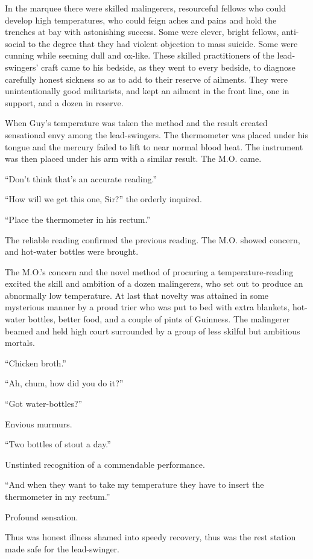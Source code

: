 In the marquee there were skilled malingerers, resourceful fellows who could develop high temperatures, who could feign aches and pains and hold the trenches at bay with astonishing success. Some were clever, bright fellows, anti-social to the degree that they had violent objection to mass suicide. Some were cunning while seeming dull and ox-like. These skilled practitioners of the lead-swingers' craft came to his bedside, as they went to every bedside, to diagnose carefully honest sickness so as to add to their reserve of ailments. They were unintentionally good militarists, and kept an ailment in the front line, one in support, and a dozen in reserve.

When Guy's temperature was taken the method and the result created sensational envy among the lead-swingers. The thermometer was placed under his tongue and the mercury failed to lift to near normal blood heat. The instrument was then placed under his arm with a similar result. The M.O. came.

``Don't think that's an accurate reading.''

``How will we get this one, Sir?'' the orderly inquired.

``Place the thermometer in his rectum.''

The reliable reading confirmed the previous reading. The M.O. showed concern, and hot-water bottles were brought.

The M.O.'s concern and the novel method of procuring a temperature-reading excited the skill and ambition of a dozen malingerers, who set out to produce an abnormally low temperature. At last that novelty was attained in some mysterious manner by a proud trier who was put to bed with extra blankets, hot-water bottles, better food, and a couple of pints of Guinness. The malingerer beamed and held high court surrounded by a group of less skilful but ambitious mortals.

``Chicken broth.''

``Ah, chum, how did you do it?''

``Got water-bottles?''

Envious murmurs.

``Two bottles of stout a day.''

Unstinted recognition of a commendable performance.

``And when they want to take my temperature they have to insert the thermometer in my rectum.''

Profound sensation.

Thus was honest illness shamed into speedy recovery, thus was the rest station made safe for the lead-swinger.

